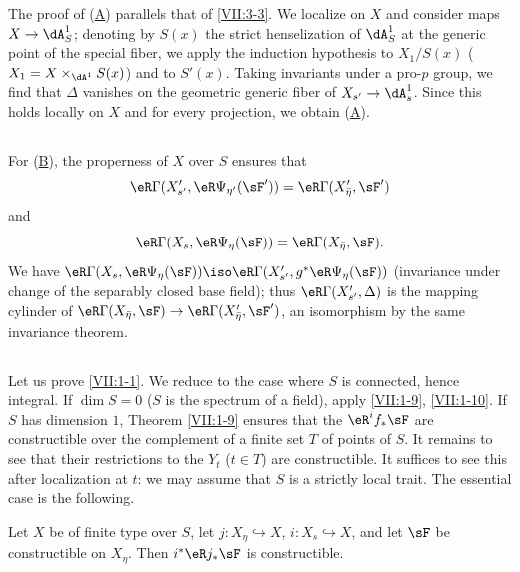 \documentclass[oneside]{book}
\begin{document}
The proof of (\hyperlink{VII:3-A}{A}) parallels that of \ref{VII:3-3}. We
localize on $X$ and consider maps $X\to \dA_S^1$; denoting by $S(x)$ the
strict henselization of $\dA_S^1$ at the generic point of the special fiber,
we apply the induction hypothesis to $X_1/S(x)$
($X_1=X\times_{\dA^1} S(x)$) and to $S'(x)$. Taking invariants under a pro-$p$
group, we find that $\Delta$ vanishes on the geometric generic fiber of
$X_{s'} \to \dA_s^1$. Since this holds locally on $X$ and for every
projection, we obtain (\hyperlink{VII:3-A}{A}).






\subsection{}\label{VII:3-9}

For (\hyperlink{VII:3-B}{B}), the properness of $X$ over $S$ ensures that
\[
  \eR\Gamma(X_{s'}',\eR\Psi_{\eta'}(\sF')) = \eR\Gamma(X_{\bar\eta}',\sF') 
\]
and
\[
  \eR\Gamma(X_s,\eR\Psi_\eta(\sF)) = \eR\Gamma(X_{\bar\eta},\sF) \text{.} 
\]
We have
$\eR\Gamma(X_s,\eR\Psi_\eta(\sF))\iso \eR\Gamma(X_{s'}',g^\ast\eR\Psi_\eta(\sF))$
(invariance under change of the separably closed base field); thus
$\eR\Gamma(X_{s'}', \Delta)$ is the mapping cylinder of
$\eR\Gamma(X_{\bar\eta},\sF) \to \eR\Gamma(X_{\bar\eta}',\sF')$, an
isomorphism by the same invariance theorem.






\subsection{}\label{VII:3-10}

Let us prove \ref{VII:1-1}. We reduce to the case where $S$ is connected,
hence integral. If $\dim S=0$ ($S$ is the spectrum of a field), apply
\ref{VII:1-9}, \ref{VII:1-10}. If $S$ has dimension $1$, Theorem
\ref{VII:1-9} ensures that the $\eR^i f_\ast \sF$ are constructible over the
complement of a finite set $T$ of points of $S$. It remains to see that their
restrictions to the $Y_t$ ($t\in T$) are constructible. It suffices to see
this after localization at $t$: we may assume that $S$ is a strictly local
trait. The essential case is the following.






\begin{lemma_}\label{VII:3-11}
Let $X$ be of finite type over $S$, let $j:X_\eta\hookrightarrow X$,
$i:X_s\hookrightarrow X$, and let $\sF$ be constructible on $X_\eta$. Then
$i^\ast\eR j_\ast \sF$ is constructible.
\end{lemma_}
\end{document}
